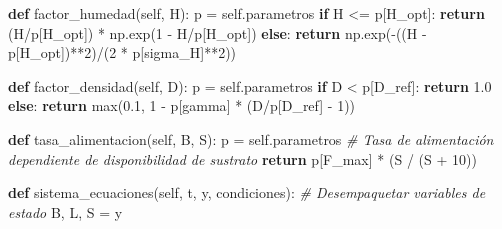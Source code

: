 \documentclass[
]{article}
\newenvironment{Shaded}{}{}
\newcommand{\BuiltInTok}[1]{\textcolor[rgb]{0.00,0.50,0.00}{#1}}
\newcommand{\CommentTok}[1]{\textcolor[rgb]{0.38,0.63,0.69}{\textit{#1}}}
\newcommand{\ControlFlowTok}[1]{\textcolor[rgb]{0.00,0.44,0.13}{\textbf{#1}}}
\newcommand{\DecValTok}[1]{\textcolor[rgb]{0.25,0.63,0.44}{#1}}
\newcommand{\FloatTok}[1]{\textcolor[rgb]{0.25,0.63,0.44}{#1}}
\newcommand{\KeywordTok}[1]{\textcolor[rgb]{0.00,0.44,0.13}{\textbf{#1}}}
\newcommand{\NormalTok}[1]{#1}
\newcommand{\OperatorTok}[1]{\textcolor[rgb]{0.40,0.40,0.40}{#1}}
\newcommand{\StringTok}[1]{\textcolor[rgb]{0.25,0.44,0.63}{#1}}
\newcommand{\VariableTok}[1]{\textcolor[rgb]{0.10,0.09,0.49}{#1}}
\begin{document}
\begin{Shaded}
\begin{Highlighting}[]
    \KeywordTok{def}\NormalTok{ factor\_humedad(}\VariableTok{self}\NormalTok{, H):}
\NormalTok{        p }\OperatorTok{=} \VariableTok{self}\NormalTok{.parametros}
        \ControlFlowTok{if}\NormalTok{ H }\OperatorTok{\textless{}=}\NormalTok{ p[}\StringTok{\textquotesingle{}H\_opt\textquotesingle{}}\NormalTok{]:}
            \ControlFlowTok{return}\NormalTok{ (H}\OperatorTok{/}\NormalTok{p[}\StringTok{\textquotesingle{}H\_opt\textquotesingle{}}\NormalTok{]) }\OperatorTok{*}\NormalTok{ np.exp(}\DecValTok{1} \OperatorTok{{-}}\NormalTok{ H}\OperatorTok{/}\NormalTok{p[}\StringTok{\textquotesingle{}H\_opt\textquotesingle{}}\NormalTok{])}
        \ControlFlowTok{else}\NormalTok{:}
            \ControlFlowTok{return}\NormalTok{ np.exp(}\OperatorTok{{-}}\NormalTok{((H }\OperatorTok{{-}}\NormalTok{ p[}\StringTok{\textquotesingle{}H\_opt\textquotesingle{}}\NormalTok{])}\OperatorTok{**}\DecValTok{2}\NormalTok{)}\OperatorTok{/}\NormalTok{(}\DecValTok{2} \OperatorTok{*}\NormalTok{ p[}\StringTok{\textquotesingle{}sigma\_H\textquotesingle{}}\NormalTok{]}\OperatorTok{**}\DecValTok{2}\NormalTok{))}
    
    \KeywordTok{def}\NormalTok{ factor\_densidad(}\VariableTok{self}\NormalTok{, D):}
\NormalTok{        p }\OperatorTok{=} \VariableTok{self}\NormalTok{.parametros}
        \ControlFlowTok{if}\NormalTok{ D }\OperatorTok{\textless{}}\NormalTok{ p[}\StringTok{\textquotesingle{}D\_ref\textquotesingle{}}\NormalTok{]:}
            \ControlFlowTok{return} \FloatTok{1.0}
        \ControlFlowTok{else}\NormalTok{:}
            \ControlFlowTok{return} \BuiltInTok{max}\NormalTok{(}\FloatTok{0.1}\NormalTok{, }\DecValTok{1} \OperatorTok{{-}}\NormalTok{ p[}\StringTok{\textquotesingle{}gamma\textquotesingle{}}\NormalTok{] }\OperatorTok{*}\NormalTok{ (D}\OperatorTok{/}\NormalTok{p[}\StringTok{\textquotesingle{}D\_ref\textquotesingle{}}\NormalTok{] }\OperatorTok{{-}} \DecValTok{1}\NormalTok{))}
    
    \KeywordTok{def}\NormalTok{ tasa\_alimentacion(}\VariableTok{self}\NormalTok{, B, S):}
\NormalTok{        p }\OperatorTok{=} \VariableTok{self}\NormalTok{.parametros}
        \CommentTok{\# Tasa de alimentación dependiente de disponibilidad de sustrato}
        \ControlFlowTok{return}\NormalTok{ p[}\StringTok{\textquotesingle{}F\_max\textquotesingle{}}\NormalTok{] }\OperatorTok{*}\NormalTok{ (S }\OperatorTok{/}\NormalTok{ (S }\OperatorTok{+} \DecValTok{10}\NormalTok{))}
    
    \KeywordTok{def}\NormalTok{ sistema\_ecuaciones(}\VariableTok{self}\NormalTok{, t, y, condiciones):}
        \CommentTok{\# Desempaquetar variables de estado}
\NormalTok{        B, L, S }\OperatorTok{=}\NormalTok{ y}
        

\end{Highlighting}
\end{Shaded}
\end{document}
